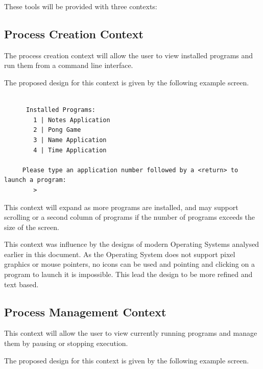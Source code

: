 \documentclass[a4paper]{report}
\begin{document}
These tools will be provided with three contexts:

\subsection{Process Creation Context}

The process creation context will allow the user to view installed programs and run them from a command line interface.

The proposed design for this context is given by the following example screen.
{\ttfamily \small
  \begin{framed}
    \begin{verbatim}

      Installed Programs:
        1 | Notes Application
        2 | Pong Game
        3 | Name Application
        4 | Time Application

     Please type an application number followed by a <return> to launch a program:
        >

    \end{verbatim}
  \end{framed}
}


This context will expand as more programs are installed, and may support scrolling or a second column of programs if the number of programs exceeds the size of the screen.

This context was influence by the designs of modern Operating Systems analysed earlier in this document. As the Operating System does not support pixel graphics or mouse pointers, no icons can be used and pointing and clicking on a program to launch it is impossible. This lead the design to be more refined and text based.


\subsection{Process Management Context}

This context will allow the user to view currently running programs and manage them by pausing or stopping execution.

The proposed design for this context is given by the following example screen.
\end{document}
